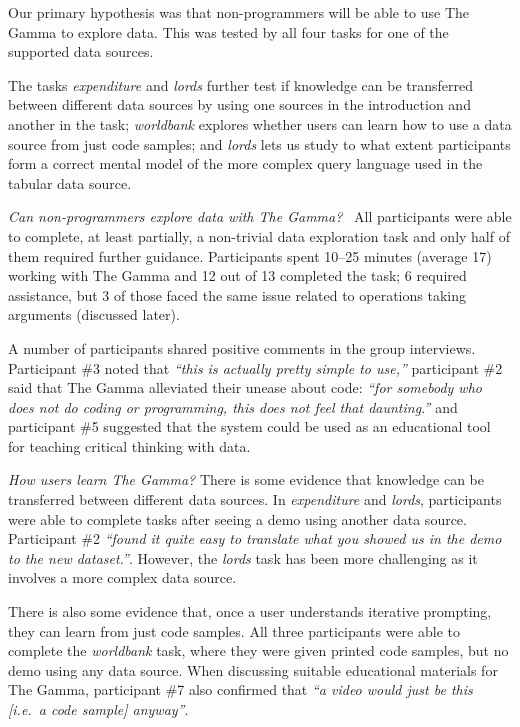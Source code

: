 \documentclass[conference]{IEEEtran}
\begin{document}
\noindent
Our primary hypothesis was that non-programmers will be able to use The Gamma to explore
data. This was tested by all four tasks for one of the supported data sources.

The tasks \emph{expenditure} and \emph{lords} further test if knowledge can be transferred between
different data sources by using one sources in the introduction and another in the task;
\emph{worldbank} explores whether users can learn how to use a data source from just code samples;
and \emph{lords} lets us study to what extent participants form a correct mental model of the
more complex query language used in the tabular data source.


\vspace{0.5em}
\emph{Can non-programmers explore data with The Gamma?}~
All participants were able to complete, at least partially, a non-trivial data exploration task and
only half of them required further guidance. Participants spent 10--25 minutes (average 17)
working with The Gamma and 12 out of 13 completed the task; 6 required assistance, but 3 of those
faced the same issue related to operations taking arguments (discussed later).

A number of participants shared positive comments in the group interviews.
Participant \#3 noted that \emph{``this is actually pretty simple to use,''}
participant \#2 said that The Gamma alleviated their unease about code:
\emph{``for somebody who does not do coding or programming, this does not feel that daunting.''}
and participant \#5 suggested that the system could be used as an educational tool for teaching
critical thinking with data.

\vspace{0.5em}
\emph{How users learn The Gamma?}
There is some evidence that knowledge can be transferred between different data sources. In
\emph{expenditure} and \emph{lords}, participants were able to complete tasks after seeing a demo
using another data source. Participant \#2 \emph{``found it quite easy to translate what you showed
us in the demo to the new dataset.''}. However, the \emph{lords} task has been more challenging as
it involves a more complex data source.

There is also some evidence that, once a user understands iterative prompting, they can learn
from just code samples. All three participants were able to complete the \emph{worldbank} task,
where they were given printed code samples, but no demo using any data source. When discussing
suitable educational materials for The Gamma, participant \#7 also confirmed that
\emph{``a video would just be this [i.e.~a code sample] anyway''}.
\end{document}
